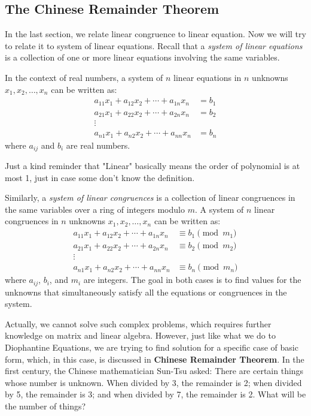         \subsection{The Chinese Remainder Theorem}
        In the last section, we relate linear congruence to linear equation. Now we will try to relate it to system of linear equations.
        Recall that a \textit{system of linear equations} is a collection of one or more linear equations involving the same variables. 
        \begin{definition}
        In the context of real numbers, a system of $n$ linear equations in $n$ unknowns $x_1, x_2, \ldots, x_n$ can be written as:
        \begin{align*}
        a_{11}x_1 + a_{12}x_2 + \cdots + a_{1n}x_n &= b_1 \\
        a_{21}x_1 + a_{22}x_2 + \cdots + a_{2n}x_n &= b_2 \\
        \vdots &\\
        a_{n1}x_1 + a_{n2}x_2 + \cdots + a_{nn}x_n &= b_n
        \end{align*}
        where $a_{ij}$ and $b_i$ are real numbers.
        \begin{remark}
            Just a kind reminder that "Linear" basically means the order of polynomial is at most 1, just in case some don't know
            the definition.
        \end{remark}
        \end{definition}
        \begin{definition}
        Similarly, a \textit{system of linear congruences} is a collection of linear congruences in the same variables over a ring of integers modulo $m$. A system of $n$ linear congruences in $n$ unknowns $x_1, x_2, \ldots, x_n$ can be written as:
        \begin{align*}
        a_{11}x_1 + a_{12}x_2 + \cdots + a_{1n}x_n &\equiv b_1 \pmod{m_1} \\
        a_{21}x_1 + a_{22}x_2 + \cdots + a_{2n}x_n &\equiv b_2 \pmod{m_2} \\
        \vdots &\\
        a_{n1}x_1 + a_{n2}x_2 + \cdots + a_{nn}x_n &\equiv b_n \pmod{m_n}
        \end{align*}
        where $a_{ij}$, $b_i$, and $m_i$ are integers. The goal in both cases is to find values for the unknowns that simultaneously 
        satisfy all the equations or congruences in the system.
        \end{definition}
        Actually, we cannot solve such complex problems, which  requires further knowledge on matrix and linear algebra. However, just like
        what we do to Diophantine Equations, we are trying to find solution for a specific case of basic form, which, in this case, is 
        discussed in \textbf{Chinese Remainder Theorem}.
        In the first century, the Chinese mathematician Sun-Tsu asked: 
        There are certain things whose number is unknown. When divided by 3, the remainder is 2; when divided by 5, the remainder is 3; 
        and when divided by 7, the remainder is 2. What will be the number of things?

